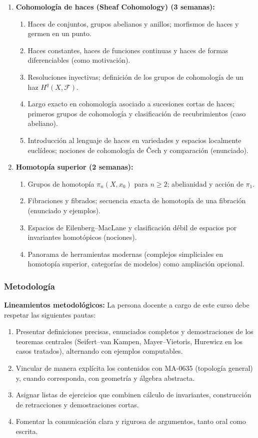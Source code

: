 \begin{refsection}
\begin{enumerate}
\item \textbf{Cohomología de haces (Sheaf Cohomology) (3 semanas):}
\begin{enumerate}
    \item Haces de conjuntos, grupos abelianos y anillos; morfismos de haces y germen en un punto.
    \item Haces constantes, haces de funciones continuas y haces de formas diferenciables (como motivación).
    \item Resoluciones inyectivas; definición de los grupos de cohomología de un haz $H^q(X,\mathcal{F})$.
    \item Largo exacto en cohomología asociado a sucesiones cortas de haces; primeros grupos de cohomología y clasificación de recubrimientos (caso abeliano).
    \item Introducción al lenguaje de haces en variedades y espacios localmente euclídeos; nociones de cohomología de Čech y comparación (enunciado).
\end{enumerate}

\item \textbf{Homotopía superior (2 semanas):}
\begin{enumerate}
    \item Grupos de homotopía $\pi_n(X,x_0)$ para $n \ge 2$; abelianidad y acción de $\pi_1$.
    \item Fibraciones y fibrados; secuencia exacta de homotopía de una fibración (enunciado y ejemplos).
    \item Espacios de Eilenberg--MacLane y clasificación débil de espacios por invariantes homotópicos (nociones).
    \item Panorama de herramientas modernas (complejos simpliciales en homotopía superior, categorías de modelos) como ampliación opcional.
\end{enumerate}

\end{enumerate}

\subsubsection*{Metodología}

\noindent \textbf{Lineamientos metodológicos:} La persona docente a cargo de este curso debe respetar las siguientes pautas:
\begin{enumerate}
    \item Presentar definiciones precisas, enunciados completos y demostraciones de los teoremas centrales (Seifert--van Kampen, Mayer--Vietoris, Hurewicz en los casos tratados), alternando con ejemplos computables.
    \item Vincular de manera explícita los contenidos con MA-0635 (topología general) y, cuando corresponda, con geometría y álgebra abstracta.
    \item Asignar listas de ejercicios que combinen cálculo de invariantes, construcción de retracciones y demostraciones cortas.
    \item Fomentar la comunicación clara y rigurosa de argumentos, tanto oral como escrita.
\end{enumerate}


\end{refsection}
